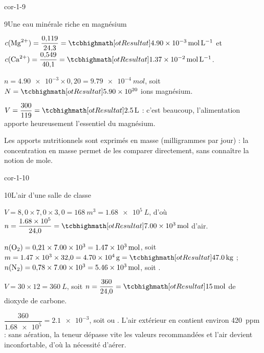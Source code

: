 \begin{blocLivre}{cor-1-9}
\begin{corrige}{9}{Une eau minérale riche en magnésium}
\begin{questions}
\item $c(\ce{Mg^{2+}})=\dfrac{0{,}119}{24{,}3}=\res{\qty{4,90e-3}{mol.L^{-1}}}$ et $c(\ce{Ca^{2+}})=\dfrac{0{,}549}{40{,}1}=\res{\qty{1,37e-2}{mol.L^{-1}}}$.
\item $n=\num{4.90e-3}\times0{,}20=\qty{9,79e-4}{mol}$, soit $N=\res{\num{5.90e20}}$ ions magnésium.
\item $V=\dfrac{300}{119}=\res{\qty{2,5}{L}}$ : c'est beaucoup, l'alimentation apporte heureusement l'essentiel du magnésium.
\item Les apports nutritionnels sont exprimés en masse (milligrammes par jour) : la concentration en masse permet de les
comparer directement, sans connaître la notion de mole.
\end{questions}
\end{corrige}
\end{blocLivre}
\begin{blocLivre}{cor-1-10}
\begin{corrige}{10}{L'air d'une salle de classe}
\begin{questions}
\item $V=8{,}0\times7{,}0\times3{,}0=\qty{168}{m^3}=\qty{1,68e5}{L}$, d'où $n=\dfrac{\num{1.68e5}}{24{,}0}=\res{\qty{7,00e3}{mol}}$ d'air.
\item $n(\ce{O2})=0{,}21\times\num{7.00e3}=\qty{1,47e3}{mol}$, soit $m=\num{1.47e3}\times32{,}0=\qty{4,70e4}{g}=\res{\qty{47,0}{kg}}$ ;
$n(\ce{N2})=0{,}78\times\num{7.00e3}=\qty{5,46e3}{mol}$, soit .
\item $V=30\times12=\qty{360}{L}$, soit $n=\dfrac{360}{24{,}0}=\res{\qty{15}{mol}}$ de dioxyde de carbone.
\item $\dfrac{360}{\num{1.68e5}}=\num{2.1e-3}$, soit  ou . L'air extérieur en contient environ \qty{420}{ppm} : sans
aération, la teneur dépasse vite les valeurs recommandées et l'air devient inconfortable, d'où la nécessité d'aérer.
\end{questions}
\end{corrige}
\end{blocLivre}
